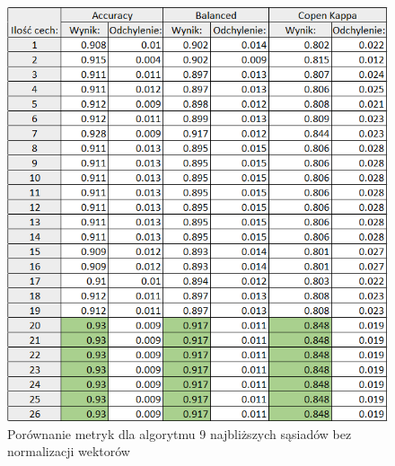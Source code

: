 \documentclass[12pt]{article}
\begin{document}
\begin{figure}[H]
	\centering
		\includegraphics[scale=0.9]{images/metrics/9nn_euklides_beznorm_tab.png}
	\caption{Porównanie metryk dla algorytmu 9 najbliższych sąsiadów bez normalizacji wektorów}
\end{figure}
\end{document}
